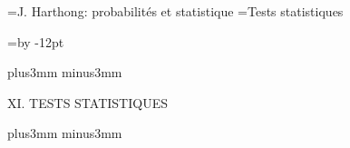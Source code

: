 


\auteurcourant={\tensl J. Harthong: probabilit\'es et statistique}
\titrecourant={\tensl Tests statistiques}


\def\w{\hskip1.2pt$\bullet$\hskip1.2pt}
\def\trv{\vrule height26.2pt depth0pt width0.4pt}

\newdimen\blocksize  \blocksize=\vsize  \advance\blocksize by -12pt

\def\six{\lower9.6pt\hbox{\trv\vbox to 26.2pt{\offinterlineskip
\hrule
\vskip2.4pt
\hbox to 25.2pt {\w\hfill\w\hfill\w}
\vfill
\hbox to 25.2pt {\w\hfill\w\hfill\w}
\vskip2pt
\hrule } \hskip-4pt\trv } }

\def\cinq{\lower9.6pt\hbox{\trv\vbox to 26.2pt{\offinterlineskip
\hrule
\vskip2pt
\hbox to 25.2pt {\w\hfill\w}
\vfill
\hbox to 25.2pt {\hfill\w\hfill}
\vfill
\hbox to 25.2pt {\w\hfill\w}
\vskip2.4pt
\hrule } \hskip-4pt\trv } }

\def\quatre{\lower9.6pt\hbox{\trv\vbox to 26.2pt{\offinterlineskip
\hrule
\vskip2.4pt
\hbox to 25.2pt {\w\hfill\w}
\vfill
\hbox to 25.2pt {\w\hfill\w}
\vskip2.4pt
\hrule } \hskip-4pt\trv } }

\def\trois{\lower9.6pt\hbox{\trv\vbox to 26.2pt{\offinterlineskip
\hrule
\vskip2.4pt
\hbox to 25.2pt {\hfill\w}
\vfill
\hbox to 25.2pt {\hfill\w\hfill}
\vfill
\hbox to 25.2pt {\w\hfill}
\vskip2.4pt
\hrule } \hskip-4pt\trv } }

\def\deux{\lower9.6pt\hbox{\trv\vbox to 26.2pt{\offinterlineskip
\hrule
\vskip4.8pt
\hbox to 25.2pt {\hfill\w\hskip2.4pt}
\vfill
\hbox to 25.2pt {\hskip2.4pt\w\hfill}
\vskip4.8pt
\hrule } \hskip-4pt\trv } }

\def\as{\lower9.6pt\hbox{\trv\vbox to 26.2pt{\offinterlineskip
\hrule
\vfill
\hbox to 25.2pt {\hfill\w\hfill}
\vfill
\hrule } \hskip-4pt\trv } }

\null\vskip10mm plus3mm minus3mm

\centerline{\tit XI. TESTS STATISTIQUES}

\vskip10mm plus3mm minus3mm

